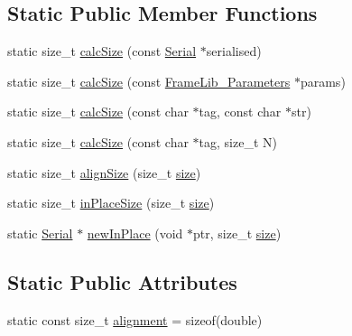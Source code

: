 \subsection*{Static Public Member Functions}
\begin{DoxyCompactItemize}
\item 
static size\+\_\+t \hyperlink{class_frame_lib___parameters_1_1_serial_ad0ef941c4f0461a59b4cdd303d7e1c89}{calc\+Size} (const \hyperlink{class_frame_lib___parameters_1_1_serial}{Serial} $\ast$serialised)
\item 
static size\+\_\+t \hyperlink{class_frame_lib___parameters_1_1_serial_ab564b2fd5443e6be053502dd3bcee927}{calc\+Size} (const \hyperlink{class_frame_lib___parameters}{Frame\+Lib\+\_\+\+Parameters} $\ast$params)
\item 
static size\+\_\+t \hyperlink{class_frame_lib___parameters_1_1_serial_a183e96d800f8d225f18beac3bdb61b17}{calc\+Size} (const char $\ast$tag, const char $\ast$str)
\item 
static size\+\_\+t \hyperlink{class_frame_lib___parameters_1_1_serial_a44526eae9c814a6a699962f8cb36b151}{calc\+Size} (const char $\ast$tag, size\+\_\+t N)
\item 
static size\+\_\+t \hyperlink{class_frame_lib___parameters_1_1_serial_afe1693889f171a4fe7ccf005a0c46520}{align\+Size} (size\+\_\+t \hyperlink{class_frame_lib___parameters_1_1_serial_a04ad46904d9fd8119283eae663901886}{size})
\item 
static size\+\_\+t \hyperlink{class_frame_lib___parameters_1_1_serial_af2dce9c3db5d635bf715152678473bc3}{in\+Place\+Size} (size\+\_\+t \hyperlink{class_frame_lib___parameters_1_1_serial_a04ad46904d9fd8119283eae663901886}{size})
\item 
static \hyperlink{class_frame_lib___parameters_1_1_serial}{Serial} $\ast$ \hyperlink{class_frame_lib___parameters_1_1_serial_a10da741b93f9798f86a97240fd4b33e8}{new\+In\+Place} (void $\ast$ptr, size\+\_\+t \hyperlink{class_frame_lib___parameters_1_1_serial_a04ad46904d9fd8119283eae663901886}{size})
\end{DoxyCompactItemize}
\subsection*{Static Public Attributes}
\begin{DoxyCompactItemize}
\item 
static const size\+\_\+t \hyperlink{class_frame_lib___parameters_1_1_serial_a9932ac93f403097497aee15214b6e762}{alignment} = sizeof(double)
\end{DoxyCompactItemize}

